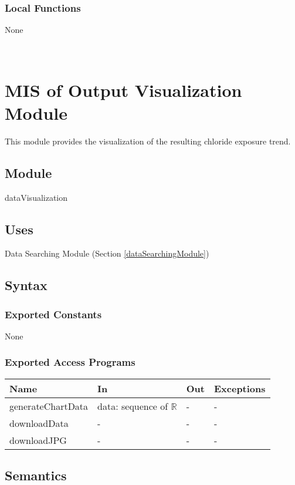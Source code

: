 \documentclass[12pt, titlepage]{article}
\begin{document}
\subsubsection{Local Functions}
None

~\newpage

\section{MIS of Output Visualization Module} \label{outputVisualizationModule}
This module provides the visualization of the resulting chloride exposure trend.

\subsection{Module}

dataVisualization

\subsection{Uses}

Data Searching Module (Section \ref{dataSearchingModule})


\subsection{Syntax}

\subsubsection{Exported Constants}
None
\subsubsection{Exported Access Programs}

\begin{center}
\begin{tabular}{p{4cm} p{4cm} p{2cm} p{2cm}}
\hline
\textbf{Name} & \textbf{In} & \textbf{Out} & \textbf{Exceptions} \\
\hline
generateChartData & data: sequence of $\mathbb{R}$ & - & - \\
downloadData & - & - & - \\
downloadJPG & - & - & - \\
\hline
\end{tabular}
\end{center}

\subsection{Semantics}
\end{document}
